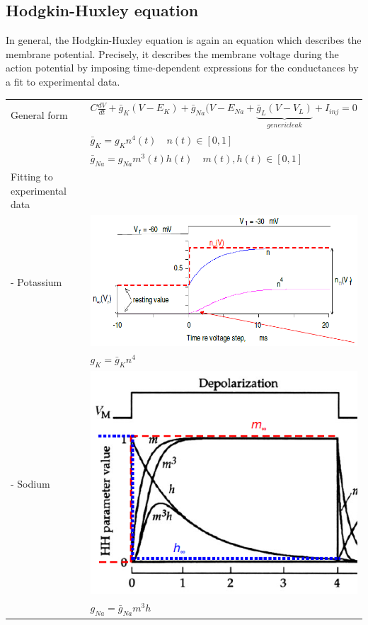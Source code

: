\subsection{Hodgkin-Huxley equation}
In general, the Hodgkin-Huxley equation is again an equation which describes the membrane potential. Precisely, it describes the membrane voltage during the action potential by imposing time-dependent expressions for the conductances by a fit to experimental data.\\
\begin{tabular}{p{4cm}p{15cm}}
General form		& $C \frac{dV}{dt} + \bar{g}_K(V-E_K) + \bar{g}_{Na}(V-E_{Na} + \underbrace{\bar{g}_L (V-V_L)}_{generic leak} + I_{inj} = 0$\\
			& $\bar{g}_K = g_K n^4(t)\quad n(t) \in [0,1]$\\
			& $\bar{g}_{Na} = g_{Na} m^3(t)h(t)\quad m(t),h(t) \in [0,1]$\\
Fitting to experimental data	\\
- Potassium	& \includegraphics[width = 10cm]{neuroinf_hhm_n.png}\\
		& $g_K = \bar{g}_Kn^4$\\
- Sodium	& \includegraphics[width = 10cm]{neuroinf_hhm_mh.png}\\
		& $g_{Na} = \bar{g}_{Na} m^3h$
\end{tabular}

